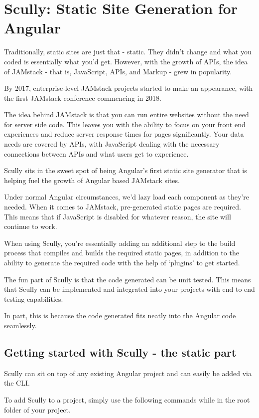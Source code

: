 \chapter{ Scully: Static Site Generation for Angular }
Traditionally, static sites are just that - static. They didn’t change and what you coded is essentially what you’d get. However, with the growth of APIs, the idea of JAMstack - that is, JavaScript, APIs, and Markup - grew in popularity.

By 2017, enterprise-level JAMstack projects started to make an appearance, with the first JAMstack conference commencing in 2018.

The idea behind JAMstack is that you can run entire websites without the need for server side code. This leaves you with the ability to focus on your front end experiences and reduce server response times for pages significantly. Your data needs are covered by APIs, with JavaScript dealing with the necessary connections between APIs and what users get to experience.

Scully sits in the sweet spot of being Angular’s first static site generator that is helping fuel the growth of Angular based JAMstack sites. 

Under normal Angular circumstances, we’d lazy load each component as they’re needed. When it comes to JAMstack, pre-generated static pages are required. This means that if JavaScript is disabled for whatever reason, the site will continue to work.

When using Scully, you’re essentially adding an additional step to the build process that compiles and builds the required static pages, in addition to the ability to generate the required code with the help of ‘plugins’ to get started.

The fun part of Scully is that the code generated can be unit tested. This means that Scully can be implemented and integrated into your projects with end to end testing capabilities.

In part, this is because the code generated fits neatly into the Angular code seamlessly. 

\section{Getting started with Scully - the static part}
Scully can sit on top of any existing Angular project and can easily be added via the CLI.

To add Scully to a project, simply use the following commands while in the root folder of your project.

